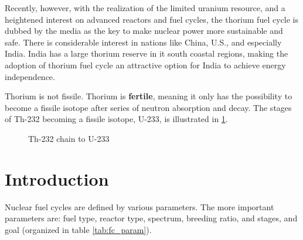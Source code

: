 \documentclass{article}
\makeatletter
\def\tikzscale{1}\begin{lrbox}{\measure@tikzpicture}%
\edef\tikzscale{\pgfmathresult}%
\makeatother
\begin{document}
Recently, however, with the realization of the limited
uranium resource, and a heightened interest on advanced
reactors and fuel cycles, the thorium fuel cycle is
dubbed by the media as the key to make nuclear power
more sustainable and safe. There is considerable interest
in nations like China, U.S., and especially India.
India has a large thorium reserve in it south coastal regions,
making the adoption of thorium fuel cycle an attractive option
for India to achieve energy independence.

Thorium is not fissile. Thorium is \textbf{fertile}, meaning
it only has the possibility to become a fissile isotope after
series of neutron absorption and decay. The stages of Th-232
becoming a fissile isotope, U-233, is illustrated in \cref{diag:th_chain}. 

\begin{figure}[h]
\caption{Th-232 chain to U-233}
\label{diag:th_chain}
\begin{scaletikzpicturetowidth}{\textwidth}
\end{scaletikzpicturetowidth}
\end{figure}


\section{Introduction}

Nuclear fuel cycles are defined by various parameters. The more important
parameters are: fuel type, reactor type, spectrum, breeding ratio, and stages, and goal
(organized in table \ref{tab:fc_param}).
\end{document}
